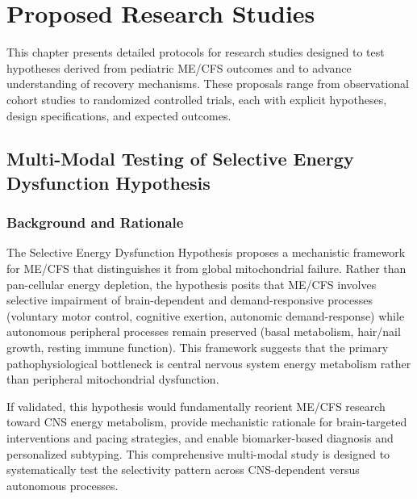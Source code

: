 \chapter{Proposed Research Studies}
\label{ch:proposed-studies}

\begin{chapterabstract}
This chapter presents detailed protocols for research studies designed to
test hypotheses derived from pediatric ME/CFS outcomes and to advance
understanding of recovery mechanisms. These proposals range from observational
cohort studies to randomized controlled trials, each with explicit hypotheses,
design specifications, and expected outcomes.
\end{chapterabstract}

\section{Multi-Modal Testing of Selective Energy Dysfunction Hypothesis}
\label{sec:selective-energy-dysfunction-study}

\subsection{Background and Rationale}

The Selective Energy Dysfunction Hypothesis proposes a mechanistic framework for ME/CFS that distinguishes it from global mitochondrial failure. Rather than pan-cellular energy depletion, the hypothesis posits that ME/CFS involves selective impairment of brain-dependent and demand-responsive processes (voluntary motor control, cognitive exertion, autonomic demand-response) while autonomous peripheral processes remain preserved (basal metabolism, hair/nail growth, resting immune function). This framework suggests that the primary pathophysiological bottleneck is central nervous system energy metabolism rather than peripheral mitochondrial dysfunction.

If validated, this hypothesis would fundamentally reorient ME/CFS research toward CNS energy metabolism, provide mechanistic rationale for brain-targeted interventions and pacing strategies, and enable biomarker-based diagnosis and personalized subtyping. This comprehensive multi-modal study is designed to systematically test the selectivity pattern across CNS-dependent versus autonomous processes.

